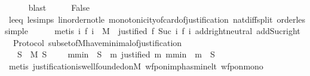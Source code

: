\begin{isabellebody}
\ \ \ \ \isamarkupfalse%
\ blast\isanewline
\ \ \isamarkupfalse%
\ \isamarkupfalse%
\ False\isanewline
\ \ \ \ \isamarkupfalse%
\ le{\isacharunderscore}{}{\isacharunderscore}eq\ le{\isacharunderscore}simps{\isacharparenleft}{}{\isacharparenright}\ linorder{\isacharunderscore}not{\isacharunderscore}le\ monotonicity{\isacharunderscore}of{\isacharunderscore}card{\isacharunderscore}of{\isacharunderscore}justification\ nat{\isacharunderscore}diff{\isacharunderscore}split\ order{\isacharunderscore}less{\isacharunderscore}imp{\isacharunderscore}le\isanewline
\ \ \ \ \isamarkupfalse%
\ {\isacharparenleft}metis\ {\isacartoucheopen}{\isasymforall}i{\isachardot}\ f\ i\ {\isasymin}\ M\ {\isasymand}\ justified\ {\isacharparenleft}f\ {\isacharparenleft}Suc\ i{\isacharparenright}{\isacharparenright}\ {\isacharparenleft}f\ i{\isacharparenright}{\isacartoucheclose}\ add{\isachardot}right{\isacharunderscore}neutral\ add{\isacharunderscore}Suc{\isacharunderscore}right{\isacharparenright}\isanewline
{}\isamarkupfalse%
%
\endisatagproof
{\isafoldproof}%
%
\isadelimproof
\isanewline
%
\endisadelimproof
\isanewline
{}\isamarkupfalse%
\ {\isacharparenleft}\ Protocol{\isacharparenright}\ subset{\isacharunderscore}of{\isacharunderscore}M{\isacharunderscore}have{\isacharunderscore}minimal{\isacharunderscore}of{\isacharunderscore}justification\ {\isacharcolon}\isanewline
\ \ {\isachardoublequoteopen}{\isasymforall}\ S\ {\isasymsubseteq}\ M{\isachardot}\ S\ {\isasymnoteq}\ {\isasymemptyset}\ {\isasymlongrightarrow}\ {\isacharparenleft}{\isasymexists}\ m{\isacharunderscore}min\ {\isasymin}\ S{\isachardot}\ {\isasymforall}\ m{\isachardot}\ justified\ m\ m{\isacharunderscore}min\ {\isasymlongrightarrow}\ m\ {\isasymnotin}\ S{\isacharparenright}{\isachardoublequoteclose}\isanewline
%
\isadelimproof
\ \ %
\endisadelimproof
%
\isatagproof
{}\isamarkupfalse%
\ {\isacharparenleft}metis\ justification{\isacharunderscore}is{\isacharunderscore}well{\isacharunderscore}founded{\isacharunderscore}on{\isacharunderscore}M\ wfp{\isacharunderscore}on{\isacharunderscore}imp{\isacharunderscore}has{\isacharunderscore}min{\isacharunderscore}elt\ wfp{\isacharunderscore}on{\isacharunderscore}mono{\isacharparenright}%
\endisatagproof
{\isafoldproof}%
%
\isadelimproof
\isanewline
%
\endisadelimproof
%
\isadelimtheory
\isanewline
%
\endisadelimtheory
%
\isatagtheory
{}\isamarkupfalse%
%
\endisatagtheory
{\isafoldtheory}%
%
\isadelimtheory
%
\endisadelimtheory
%
\end{isabellebody}%
